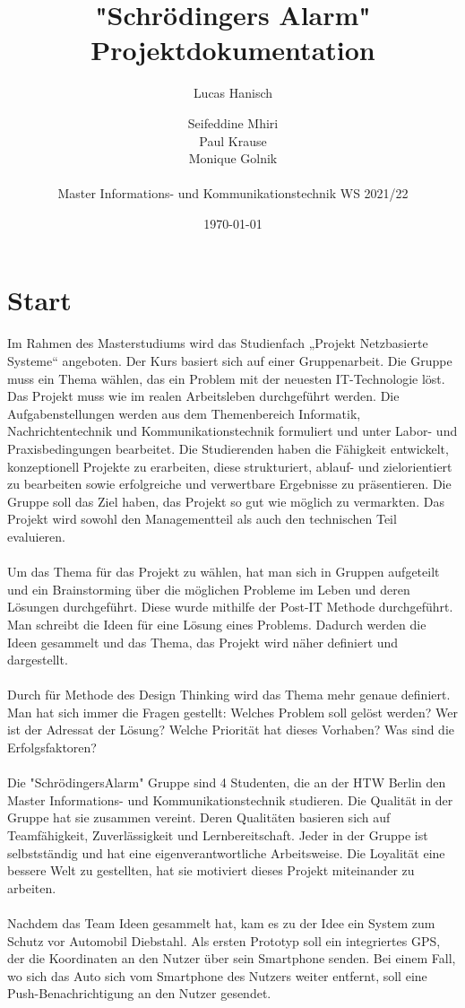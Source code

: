 \documentclass[11pt,a4paper,ngerman]{report}
\date{\today}
\title{"Schrödingers Alarm"\\ Projektdokumentation}
\author{Lucas Hanisch \and Seifeddine Mhiri \\ Paul Krause  \\  Monique Golnik \\ \\Master Informations- und Kommunikationstechnik WS 2021/22}
\begin{document}
	\maketitle
	\tableofcontents
	
	\chapter{Start}
	
Im Rahmen des Masterstudiums wird das Studienfach „Projekt Netzbasierte Systeme“ angeboten. Der Kurs basiert sich auf einer Gruppenarbeit.
Die Gruppe muss ein Thema wählen, das ein Problem mit der neuesten IT-Technologie löst. Das Projekt muss wie im realen Arbeitsleben durchgeführt werden. Die Aufgabenstellungen werden aus dem Themenbereich Informatik, Nachrichtentechnik und Kommunikationstechnik formuliert und unter Labor- und
Praxisbedingungen bearbeitet. Die Studierenden haben die Fähigkeit entwickelt, konzeptionell Projekte zu erarbeiten, diese strukturiert, ablauf- und zielorientiert zu
bearbeiten sowie erfolgreiche und verwertbare Ergebnisse zu präsentieren.
Die Gruppe soll das Ziel haben, das Projekt so gut wie möglich zu vermarkten.
Das Projekt wird sowohl den Managementteil als auch den technischen Teil evaluieren.\\\\
Um das Thema für das Projekt zu wählen, hat man sich in Gruppen aufgeteilt und ein Brainstorming über die möglichen Probleme im Leben und deren Lösungen durchgeführt. 
Diese wurde mithilfe der Post-IT Methode durchgeführt. Man schreibt die Ideen für eine Lösung eines Problems.
Dadurch werden die Ideen gesammelt und das Thema, das Projekt wird näher definiert und  dargestellt. \\\\
Durch für Methode des Design Thinking wird das Thema mehr genaue definiert. Man hat sich immer die Fragen gestellt: Welches Problem soll gelöst werden? Wer ist der Adressat der Lösung? Welche Priorität hat dieses Vorhaben? Was sind die Erfolgsfaktoren? \\\\
Die "SchrödingersAlarm" Gruppe sind 4 Studenten, die an der HTW Berlin den Master Informations- und Kommunikationstechnik studieren. Die Qualität in der Gruppe hat sie zusammen vereint. Deren Qualitäten basieren sich auf Teamfähigkeit, Zuverlässigkeit und Lernbereitschaft. Jeder in der Gruppe ist selbstständig und hat eine eigenverantwortliche Arbeitsweise. Die Loyalität eine bessere Welt zu gestellten, hat sie motiviert dieses Projekt miteinander zu arbeiten.\\\\
Nachdem das Team Ideen gesammelt hat, kam es zu der Idee ein System zum Schutz vor Automobil Diebstahl. 
Als ersten Prototyp soll ein integriertes GPS, der die Koordinaten an den Nutzer über sein Smartphone senden. 
Bei einem Fall, wo sich das Auto sich vom Smartphone des Nutzers weiter entfernt, soll eine Push-Benachrichtigung an den Nutzer gesendet.
		
\end{document}
